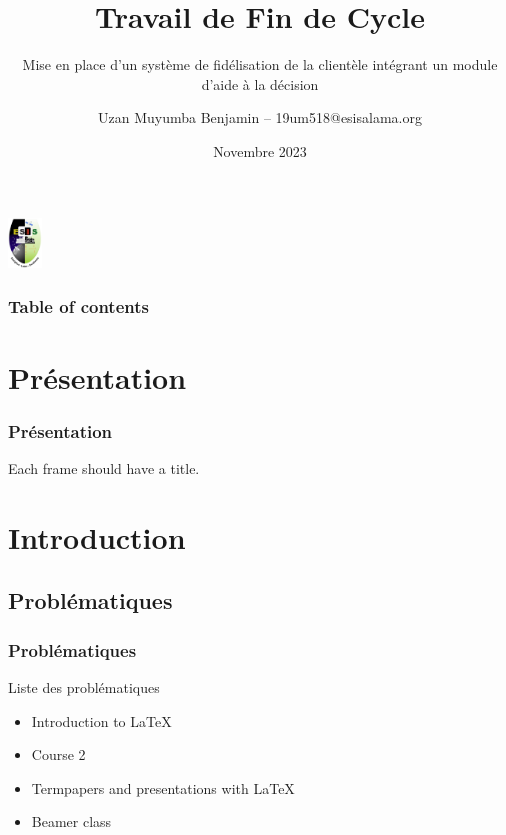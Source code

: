\documentclass{beamer}
\begin{document}
    \title{Travail de Fin de Cycle}
    \subtitle{Mise en place d’un système de fidélisation de la clientèle
    intégrant un module d’aide à la décision}
    \author{Uzan Muyumba Benjamin -- 19um518@esisalama.org}
    \date{Novembre 2023} 


    \begin{frame}
        \begin{center}
            \includegraphics[width=0.9cm]{logoesis.png}
        \end{center}
        \vspace*{-1em}
        \titlepage
    \end{frame}

    \begin{frame}
        \frametitle{Table of contents}
        \tableofcontents
    \end{frame} 


    \section{Présentation}
        \begin{frame}\frametitle{Présentation} 
            Each frame should have a title.
        \end{frame}

    \section{Introduction} 
        \subsection{Problématiques}
            \begin{frame}\frametitle{Problématiques}
                \begin{alertblock}{Liste des problématiques}
                    \begin{itemize}
                        \item Introduction to  \LaTeX \pause 
                        \item Course 2 \pause
                        \item Termpapers and presentations with \LaTeX \pause
                        \item Beamer class 
                    \end{itemize} 
                \end{alertblock}
        \end{frame}
\end{document}
